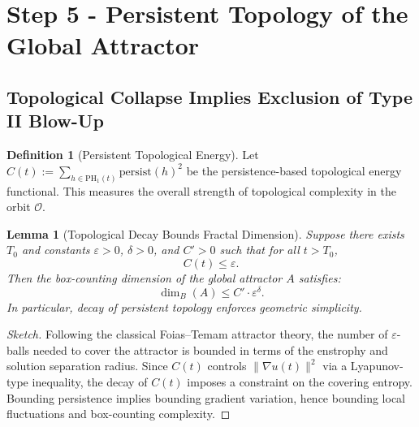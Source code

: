 \documentclass[11pt]{article}
\newtheorem{lemma}[theorem]{Lemma}
\theoremstyle{definition}
\newtheorem{definition}[theorem]{Definition}
\begin{document}
\section{Step 5 - Persistent Topology of the Global Attractor}
\label{sec:step5}

\subsection{Topological Collapse Implies Exclusion of Type II Blow-Up}

\begin{definition}[Persistent Topological Energy]
Let $C(t) := \sum_{h \in \mathrm{PH}_1(t)} \mathrm{persist}(h)^2$ be the persistence-based topological energy functional. This measures the overall strength of topological complexity in the orbit $\mathcal{O}$.
\end{definition}

\begin{lemma}[Topological Decay Bounds Fractal Dimension]
\label{lem:fractal-dim-bound}
Suppose there exists $T_0$ and constants $\varepsilon > 0$, $\delta > 0$, and $C' > 0$ such that for all $t > T_0$,
\[
C(t) \le \varepsilon.
\]
Then the box-counting dimension of the global attractor $A$ satisfies:
\[
\dim_B(A) \le C' \cdot \varepsilon^{\delta}.
\]
In particular, decay of persistent topology enforces geometric simplicity.
\end{lemma}

\begin{proof}[Sketch]
Following the classical Foias–Temam attractor theory, the number of $\varepsilon$-balls needed to cover the attractor is bounded in terms of the enstrophy and solution separation radius. Since $C(t)$ controls $\|\nabla u(t)\|^2$ via a Lyapunov-type inequality, the decay of $C(t)$ imposes a constraint on the covering entropy. Bounding persistence implies bounding gradient variation, hence bounding local fluctuations and box-counting complexity.
\end{proof}
\end{document}

